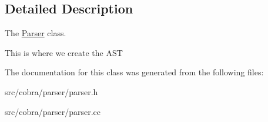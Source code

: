\subsection{Detailed Description}
The \hyperlink{class_cobra_1_1internal_1_1_parser}{Parser} class. 

This is where we create the A\+S\+T 

The documentation for this class was generated from the following files\+:\begin{DoxyCompactItemize}
\item 
src/cobra/parser/parser.\+h\item 
src/cobra/parser/parser.\+cc\end{DoxyCompactItemize}

